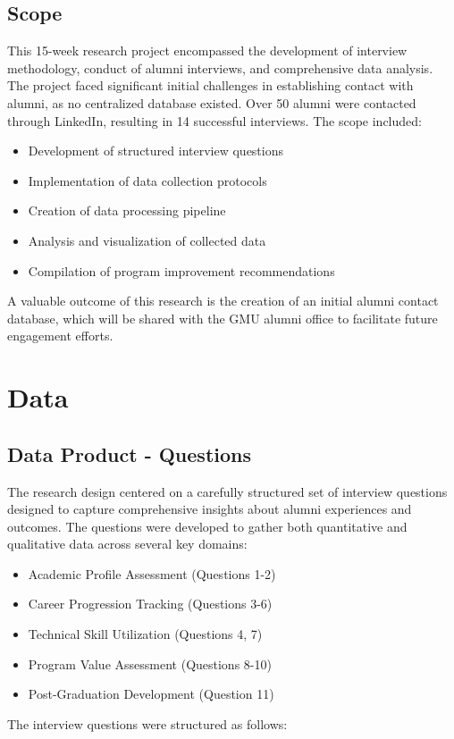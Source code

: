 \documentclass[12pt,a4paper]{article}
\begin{document}
\subsection{Scope}
This 15-week research project encompassed the development of interview methodology, conduct of alumni interviews, and comprehensive data analysis. The project faced significant initial challenges in establishing contact with alumni, as no centralized database existed. Over 50 alumni were contacted through LinkedIn, resulting in 14 successful interviews. The scope included:
\begin{itemize}
\item Development of structured interview questions
\item Implementation of data collection protocols
\item Creation of data processing pipeline
\item Analysis and visualization of collected data
\item Compilation of program improvement recommendations
\end{itemize}
A valuable outcome of this research is the creation of an initial alumni contact database, which will be shared with the GMU alumni office to facilitate future engagement efforts.

\newpage

\section{Data}
\subsection{Data Product - Questions}
The research design centered on a carefully structured set of interview questions designed to capture comprehensive insights about alumni experiences and outcomes. The questions were developed to gather both quantitative and qualitative data across several key domains:
\begin{itemize}
\item Academic Profile Assessment (Questions 1-2)
\item Career Progression Tracking (Questions 3-6)
\item Technical Skill Utilization (Questions 4, 7)
\item Program Value Assessment (Questions 8-10)
\item Post-Graduation Development (Question 11)
\end{itemize}
The interview questions were structured as follows:
\end{document}
